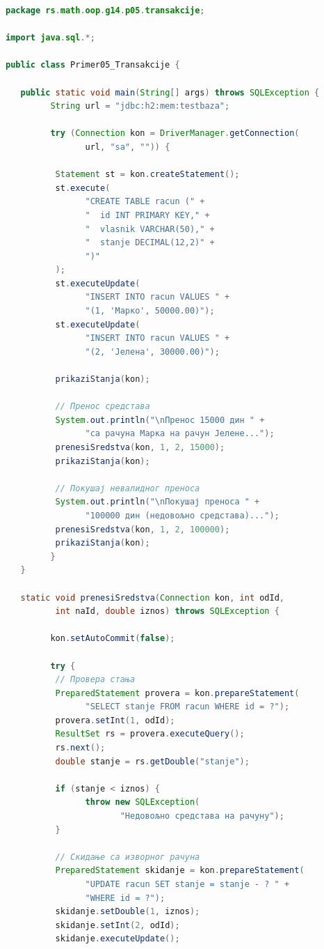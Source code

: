 \begin{lstlisting}[language=Java]
package rs.math.oop.g14.p05.transakcije;
 
import java.sql.*;
 
public class Primer05_Transakcije {
 
   public static void main(String[] args) throws SQLException {
         String url = "jdbc:h2:mem:testbaza";
 
         try (Connection kon = DriverManager.getConnection(
                url, "sa", "")) {
 
          Statement st = kon.createStatement();
          st.execute(
                "CREATE TABLE racun (" +
                "  id INT PRIMARY KEY," +
                "  vlasnik VARCHAR(50)," +
                "  stanje DECIMAL(12,2)" +
                ")"
          );
          st.executeUpdate(
                "INSERT INTO racun VALUES " +
                "(1, 'Марко', 50000.00)");
          st.executeUpdate(
                "INSERT INTO racun VALUES " +
                "(2, 'Јелена', 30000.00)");
 
          prikaziStanja(kon);
 
          // Пренос средстава
          System.out.println("\nПренос 15000 дин " +
                "са рачуна Марка на рачун Јелене...");
          prenesiSredstva(kon, 1, 2, 15000);
          prikaziStanja(kon);
 
          // Покушај невалидног преноса
          System.out.println("\nПокушај преноса " +
                "100000 дин (недовољно средстава)...");
          prenesiSredstva(kon, 1, 2, 100000);
          prikaziStanja(kon);
         }
   }
 
   static void prenesiSredstva(Connection kon, int odId,
          int naId, double iznos) throws SQLException {
 
         kon.setAutoCommit(false);
 
         try {
          // Провера стања
          PreparedStatement provera = kon.prepareStatement(
                "SELECT stanje FROM racun WHERE id = ?");
          provera.setInt(1, odId);
          ResultSet rs = provera.executeQuery();
          rs.next();
          double stanje = rs.getDouble("stanje");
 
          if (stanje < iznos) {
                throw new SQLException(
                       "Недовољно средстава на рачуну");
          }
 
          // Скидање са изворног рачуна
          PreparedStatement skidanje = kon.prepareStatement(
                "UPDATE racun SET stanje = stanje - ? " +
                "WHERE id = ?");
          skidanje.setDouble(1, iznos);
          skidanje.setInt(2, odId);
          skidanje.executeUpdate();
 

\end{lstlisting}
